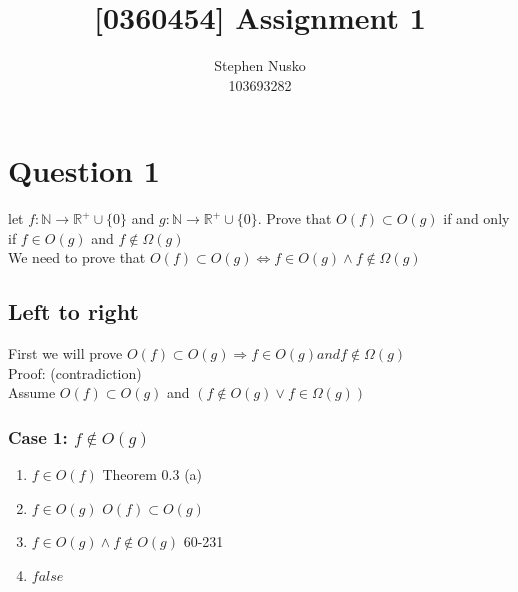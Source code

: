 \documentclass{article}
\title{[0360454] Assignment 1}
\author{Stephen Nusko \\ 103693282}
\begin{document}
	\thispagestyle{empty}
	\maketitle	
  \section{Question 1}
    let $f: \mathbb{N} \rightarrow \mathbb{R}^{+}\cup \{0\}$ and $g: \mathbb{N} \rightarrow \mathbb{R}^{+} \cup \{0\}$. Prove that $O(f) \subset O(g)$ if and only if $f \in O(g)$ and $f \not\in \Omega(g)$ \\
    We need to prove that $O(f) \subset O(g) \Leftrightarrow  f \in O(g) \land f \not\in \Omega(g)$ \\
    \subsection{Left to right}
      First we will prove $O(f) \subset O(g) \Rightarrow f \in O(g) and f \not\in \Omega(g)$ \\
      Proof: (contradiction) \\
      Assume $O(f) \subset O(g)$ and $(f \not\in O(g) \lor f \in \Omega(g))$ \\
      \subsubsection{Case 1: $f \not\in O(g)$}
      \begin{enumerate}
        \item $f \in O(f)$ \hfill Theorem 0.3 (a)
        \item $f \in O(g)$ \hfill $O(f) \subset O(g)$
        \item $f \in O(g) \land f \not\in O(g)$ \hfill 60-231
        \item $false$
      \end{enumerate}
\end{document}
